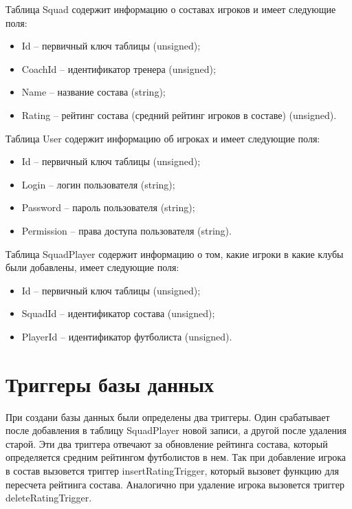 Таблица Squad содержит информацию о составах игроков и имеет следующие поля:

\begin{itemize}
    \item Id -- первичный ключ таблицы (unsigned);
    \item CoachId -- идентификатор тренера (unsigned);
    \item Name -- название состава (string);
    \item Rating -- рейтинг состава (средний рейтинг игроков в составе) (unsigned).
\end{itemize}

Таблица User содержит информацию об игроках и имеет следующие поля:

\begin{itemize}
    \item Id -- первичный ключ таблицы (unsigned);
    \item Login -- логин пользователя (string);
    \item Password -- пароль пользователя (string);
    \item Permission -- права доступа пользователя (string).
\end{itemize}

Таблица SquadPlayer содержит информацию о том, какие игроки в какие клубы были добавлены, имеет следующие поля:

\begin{itemize}
    \item Id -- первичный ключ таблицы (unsigned);
    \item SquadId -- идентификатор состава (unsigned);
    \item PlayerId -- идентификатор футболиста (unsigned).
\end{itemize}

\section{Триггеры базы данных}

При создани базы данных были определены два триггеры. Один срабатывает после добавления в таблицу SquadPlayer новой записи, а другой после удаления старой. Эти два триггера отвечают за обновление рейтинга состава, который определяется средним рейтингом футболистов в нем. Так при добавление игрока в состав вызовется триггер insertRatingTrigger, который вызовет функцию для пересчета рейтинга состава. Аналогично при удаление игрока вызовется триггер deleteRatingTrigger. 

